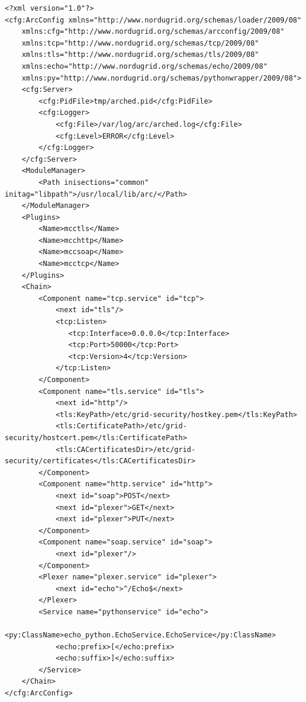 \documentclass{article}
\begin{document}
\begin{verbatim}
<?xml version="1.0"?>
<cfg:ArcConfig xmlns="http://www.nordugrid.org/schemas/loader/2009/08"
	xmlns:cfg="http://www.nordugrid.org/schemas/arcconfig/2009/08"
	xmlns:tcp="http://www.nordugrid.org/schemas/tcp/2009/08"
	xmlns:tls="http://www.nordugrid.org/schemas/tls/2009/08"
	xmlns:echo="http://www.nordugrid.org/schemas/echo/2009/08"
	xmlns:py="http://www.nordugrid.org/schemas/pythonwrapper/2009/08">
    <cfg:Server>
        <cfg:PidFile>tmp/arched.pid</cfg:PidFile>
        <cfg:Logger>
            <cfg:File>/var/log/arc/arched.log</cfg:File>
            <cfg:Level>ERROR</cfg:Level>
        </cfg:Logger>
    </cfg:Server>
    <ModuleManager>
        <Path inisections="common" initag="libpath">/usr/local/lib/arc/</Path>
    </ModuleManager>
    <Plugins>
        <Name>mcctls</Name>
        <Name>mcchttp</Name>
        <Name>mccsoap</Name>
        <Name>mcctcp</Name>
    </Plugins>
    <Chain>
        <Component name="tcp.service" id="tcp">
            <next id="tls"/>
            <tcp:Listen>
               <tcp:Interface>0.0.0.0</tcp:Interface>
               <tcp:Port>50000</tcp:Port>
               <tcp:Version>4</tcp:Version>
            </tcp:Listen>
        </Component>
        <Component name="tls.service" id="tls">
            <next id="http"/>
            <tls:KeyPath>/etc/grid-security/hostkey.pem</tls:KeyPath>
            <tls:CertificatePath>/etc/grid-security/hostcert.pem</tls:CertificatePath>
            <tls:CACertificatesDir>/etc/grid-security/certificates</tls:CACertificatesDir>
        </Component>
        <Component name="http.service" id="http">
            <next id="soap">POST</next>
            <next id="plexer">GET</next>
            <next id="plexer">PUT</next>
        </Component>
        <Component name="soap.service" id="soap">
            <next id="plexer"/>
        </Component>
        <Plexer name="plexer.service" id="plexer">
            <next id="echo">^/Echo$</next>
        </Plexer>
        <Service name="pythonservice" id="echo">
            <py:ClassName>echo_python.EchoService.EchoService</py:ClassName>
            <echo:prefix>[</echo:prefix>
            <echo:suffix>]</echo:suffix>
        </Service>
    </Chain>
</cfg:ArcConfig>
\end{verbatim}
\end{document}
